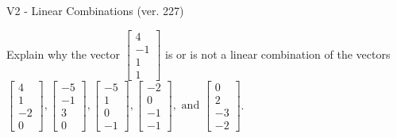 \begin{exercise}
  \begin{exerciseTitle}V2 - Linear Combinations (ver. 227)\end{exerciseTitle}
  \begin{exerciseStatement}
    Explain why the vector \(\left[\begin{array}{c}
4 \\
-1 \\
1 \\
1
\end{array}\right]\)  is or is not a linear 
	combination of the vectors \(\left[\begin{array}{c}
4 \\
1 \\
-2 \\
0
\end{array}\right] , \left[\begin{array}{c}
-5 \\
-1 \\
3 \\
0
\end{array}\right] , \left[\begin{array}{c}
-5 \\
1 \\
0 \\
-1
\end{array}\right] , \left[\begin{array}{c}
-2 \\
0 \\
-1 \\
-1
\end{array}\right] , \text{ and } \left[\begin{array}{c}
0 \\
2 \\
-3 \\
-2
\end{array}\right]\).
	



\end{exerciseStatement}
\end{exercise}
